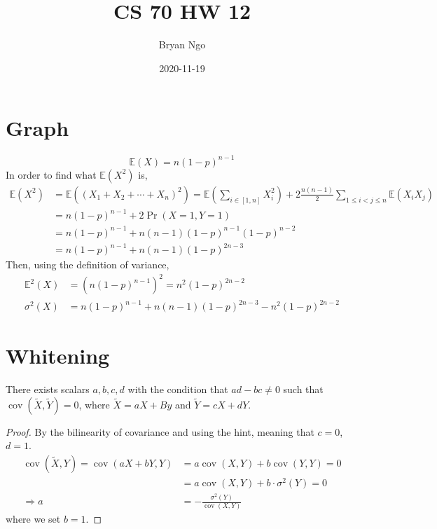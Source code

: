 \documentclass{article}
\title{CS 70 HW 12}
\author{Bryan Ngo}
\date{2020-11-19}
\newcommand{\E}{\mathbb{E}}
\newcommand{\cov}{\operatorname{cov}}
\begin{document}
\maketitle

\section{Graph}


\begin{equation}
    \E(X) = n (1 - p)^{n - 1}
\end{equation}
In order to find what \(\E(X^2)\) is,
\begin{align}
    \E(X^2) &= \E\left((X_1 + X_2 + \cdots + X_n)^2\right) = \E\left(\sum_{i \in [1, n]} X_i^2\right) + 2 \frac{n (n - 1)}{2} \sum_{1 \leqslant i < j \leqslant n} \E(X_i X_j) \\
    &= n (1 - p)^{n - 1} + 2 \Pr(X = 1, Y = 1) \\
    &= n (1 - p)^{n - 1} + n (n - 1) (1 - p)^{n - 1} (1 - p)^{n - 2} \\
    &= n (1 - p)^{n - 1} + n (n - 1) (1 - p)^{2n - 3}
\end{align}
Then, using the definition of variance,
\begin{align}
    \E^2(X) &= \left(n (1 - p)^{n - 1}\right)^2 = n^2 (1 - p)^{2n - 2} \\
    \sigma^2(X) &= n (1 - p)^{n - 1} + n (n - 1) (1 - p)^{2n - 3} - n^2 (1 - p)^{2n - 2}
\end{align}

\section{Whitening}
\begin{theorem}
    There exists scalars \(a, b, c, d\) with the condition that \(ad - bc \neq 0\) such that \(\cov(\widetilde{X}, \widetilde{Y}) = 0\), where \(\widetilde{X} = aX + By\) and \(\widetilde{Y} = cX + dY\).
\end{theorem}
\begin{proof}
    By the bilinearity of covariance and using the hint, meaning that \(c = 0\), \(d = 1\).
    \begin{align}
        \cov(\widetilde{X}, Y) = \cov(aX + bY, Y) &= a \cov(X, Y) + b \cov(Y, Y) = 0 \\
        &= a \cov(X, Y) + b \cdot \sigma^2(Y) = 0 \\
        \Rightarrow a &= -\frac{\sigma^2(Y)}{\cov(X, Y)}
    \end{align}
    where we set \(b = 1\).
\end{proof}
\end{document}
